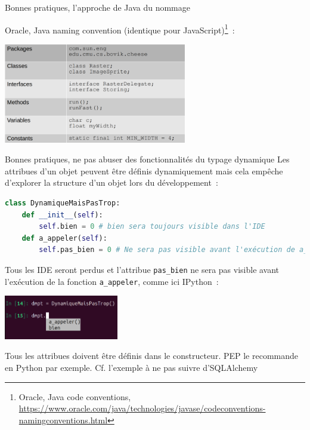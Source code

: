 \documentclass{beamer}
\begin{document}
    \begin{frame}{Bonnes pratiques, l'approche de Java du nommage}

        Oracle, Java naming convention (identique pour JavaScript)\footnote{Oracle, Java code conventions, \url{https://www.oracle.com/java/technologies/javase/codeconventions-namingconventions.html}}~:
        \bigbreak

        \centering
        \includegraphics[width=8cm]{image/Java-naming-convention}

    \end{frame}

    \begin{frame}[fragile]{Bonnes pratiques, ne pas abuser des fonctionnalités du typage dynamique}
        \pause
        Les attribues d'un objet peuvent être définis dynamiquement mais cela empêche d'explorer la structure d'un objet lors du développement~:
        \begin{lstlisting}[language=python]
class DynamiqueMaisPasTrop:
    def __init__(self):
        self.bien = 0 # bien sera toujours visible dans l'IDE
    def a_appeler(self):
        self.pas_bien = 0 # Ne sera pas visible avant l'exécution de a_appeler
        \end{lstlisting}

        Tous les IDE seront perdus et l'attribue \lstinline{pas_bien} ne sera pas visible avant l'exécution de la fonction \lstinline{a_appeler}, comme ici IPython~:

        \centering
        \includegraphics[width=5cm]{image/dynamic-trick}

        \begin{flushleft}
            Tous les attribues doivent être définis dans le constructeur.
            PEP le recommande en Python par exemple.
            Cf. l'exemple à ne pas suivre d'SQLAlchemy
        \end{flushleft}

    \end{frame}
\end{document}
